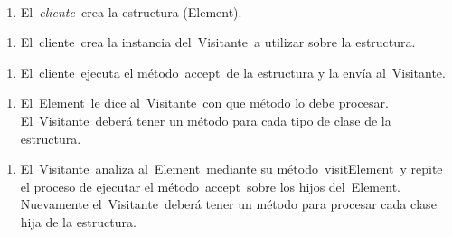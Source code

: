 \documentclass[12pt]{article}
\begin{document}
\begin{multicols}{2}

{\fontsize{9pt}{10.8pt}\selectfont  \par}\par

\begin{enumerate}[label*={\fontsize{9pt}{9pt}\selectfont \arabic*.}]
	\item {\fontsize{9pt}{10.8pt}\selectfont El \textit{cliente }crea la estructura (Element). \par}
\end{enumerate}\par

\begin{enumerate}[label*={\fontsize{9pt}{9pt}\selectfont \arabic*.}]
	\item {\fontsize{9pt}{10.8pt}\selectfont El cliente crea la instancia del Visitante a utilizar sobre la estructura. \par}
\end{enumerate}\par

\begin{enumerate}[label*={\fontsize{9pt}{9pt}\selectfont \arabic*.}]
	\item {\fontsize{9pt}{10.8pt}\selectfont El cliente ejecuta el método accept de la estructura y la envía al Visitante. \par}
\end{enumerate}\par

\begin{enumerate}[label*={\fontsize{9pt}{9pt}\selectfont \arabic*.}]
	\item {\fontsize{9pt}{10.8pt}\selectfont El Element le dice al Visitante con que método lo debe procesar. El Visitante deberá tener un método para cada tipo de clase de la estructura. \par}
\end{enumerate}\par

\begin{enumerate}[label*={\fontsize{9pt}{9pt}\selectfont \arabic*.}]
	\item {\fontsize{9pt}{10.8pt}\selectfont El Visitante analiza al Element mediante su método visitElement y repite el proceso de ejecutar el método accept sobre los hijos del Element. Nuevamente el Visitante deberá tener un método para procesar cada clase hija de la estructura. \par}
\end{enumerate}\par


\end{multicols}
\end{document}
